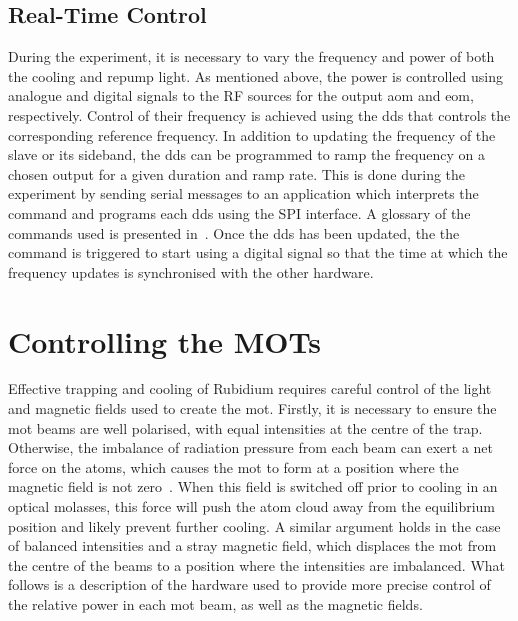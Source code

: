 \subsection{Real-Time Control} \label{subsec:muquans_comm}
During the experiment, it is necessary to vary the frequency and power of both
the cooling and repump light. As mentioned above, the power is controlled using
analogue and digital signals to the RF sources for the output \ac{aom} and
\ac{eom}, respectively. Control of their frequency is achieved using the
\ac{dds} that controls the corresponding reference frequency. In addition to
updating the frequency of the slave or its sideband, the \ac{dds} can be
programmed to ramp the frequency on a chosen output for a given duration and
ramp rate. This is done during the experiment by sending serial messages to an
application which interprets the command and programs each \ac{dds} using the
SPI interface. A glossary of the commands used is presented
in~. Once the \ac{dds} has been updated, the
the command is triggered to start using a digital signal so that the time at
which the frequency updates is synchronised with the other hardware. 

\section{Controlling the MOTs}
Effective trapping and cooling of Rubidium requires careful control of the light
and magnetic fields used to create the \ac{mot}. Firstly, it is necessary to
ensure the \ac{mot} beams are well polarised, with equal intensities at the
centre of the trap.  Otherwise, the imbalance of radiation pressure from each
beam can exert a net force on the atoms, which causes the \ac{mot} to form at a
position where the magnetic field is not zero~\cite{Steane1992}. When this field
is switched off prior to cooling in an optical molasses, this force will push
the atom cloud away from the equilibrium position and likely prevent further
cooling. A similar argument holds in the case of balanced intensities and a
stray magnetic field, which displaces the \ac{mot} from the centre of the beams
to a position where the intensities are imbalanced. What follows is a
description of the hardware used to provide more precise control of the relative
power in each \ac{mot} beam, as well as the magnetic fields. 

